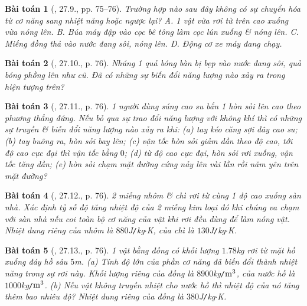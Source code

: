 \documentclass{article}
\newtheorem{baitoan}{Bài toán}
\begin{document}
\begin{baitoan}[\cite{SBT_Vat_Ly_8}, 27.9., pp. 75--76]
	Trường hợp nào sau đây không có sự chuyển hóa từ cơ năng sang nhiệt năng hoặc ngược lại? {\sf A.} 1 vật vừa rơi từ trên cao xuống vừa nóng lên. {\sf B.} Búa máy đập vào cọc bê tông làm cọc lún xuống \& nóng lên. {\sf C.} Miếng đồng thả vào nước đang sôi, nóng lên. {\sf D.} Động cơ xe máy đang chạy.
\end{baitoan}

\begin{baitoan}[\cite{SBT_Vat_Ly_8}, 27.10., p. 76]
	Nhúng 1 quả bóng bàn bị bẹp vào nước đang sôi, quả bóng phồng lên như cũ. Đã có những sự biến đổi năng lượng nào xảy ra trong hiện tượng trên?
\end{baitoan}

\begin{baitoan}[\cite{SBT_Vat_Ly_8}, 27.11., p. 76]
	1 người dùng súng cao su bắn 1 hòn sỏi lên cao theo phương thẳng đứng. Nếu bỏ qua sự trao đổi năng lượng với không khí thì có những sự truyền \& biến đổi năng lượng nào xảy ra khi: (a) tay kéo căng sợi dây cao su; (b) tay buông ra, hòn sỏi bay lên; (c) vận tốc hòn sỏi giảm dần theo độ cao, tới độ cao cực đại thì vận tốc bằng $0$; (d) từ độ cao cực đại, hòn sỏi rơi xuống, vận tốc tăng dần; (e) hòn sỏi chạm mặt đường cứng nảy lên vài lần rồi năm yên trên mặt đường?
\end{baitoan}

\begin{baitoan}[\cite{SBT_Vat_Ly_8}, 27.12., p. 76]
	2 miếng nhôm \& chì rơi từ cùng 1 độ cao xuống sàn nhà. Xác định tỷ số độ tăng nhiệt độ của 2 miếng kim loại đó khi chúng va chạm với sàn nhà nếu coi toàn bộ cơ năng của vật khi rơi đều dùng để làm nóng vật. Nhiệt dung riêng của nhôm là $880$\emph{J\texttt{/}kg$\cdot$K}, của chì là $130$\emph{J\texttt{/}kg$\cdot$K}.
\end{baitoan}

\begin{baitoan}[\cite{SBT_Vat_Ly_8}, 27.13., p. 76]
	1 vật bằng đồng có khối lượng $1.78$\emph{kg} rơi từ mặt hồ xuống đáy hồ sâu $5$\emph{m}. (a) Tính độ lớn của phần cơ năng đã biến đổi thành nhiệt năng trong sự rơi này. Khối lượng riêng của đồng là $8900$\emph{kg\texttt{/}$\rm m^3$}, của nước hồ là $1000$\emph{kg\texttt{/}$\rm m^3$}. (b) Nếu vật không truyền nhiệt cho nước hồ thì nhiệt độ của nó tăng thêm bao nhiêu độ? Nhiệt dung riêng của đồng là $380$\emph{J\texttt{/}kg$\cdot$K}.
\end{baitoan}
\end{document}
